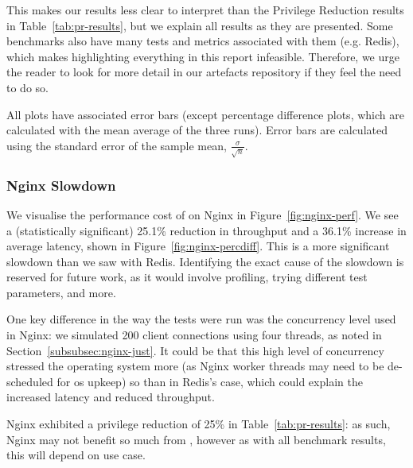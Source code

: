 This makes our results less clear to interpret than the Privilege Reduction
results in Table~\ref{tab:pr-results}, but we explain all
results as they are presented. Some benchmarks also have many tests
and metrics associated with them (e.g. Redis), which makes highlighting everything in this
report infeasible. Therefore, we urge the reader to look for more detail in our
artefacts repository if they feel the need to do so.

All plots have associated error bars (except percentage difference plots, which
are calculated with the mean average of the three runs). Error bars are
calculated using the standard error of the sample mean, 
$\frac{\sigma}{\sqrt n}$.

\subsubsection{Nginx Slowdown}\label{subsubsec:nginx-slowdown}

We visualise the performance cost of \af on Nginx in
Figure~\ref{fig:nginx-perf}. We see a (statistically significant) 25.1\%
reduction in throughput and a 36.1\% increase in average latency, shown in
Figure~\ref{fig:nginx-percdiff}. This is a more significant slowdown than
we saw with Redis. Identifying the exact cause of the slowdown is reserved
for future work, as it would involve profiling, trying different test
parameters, and more. 

One key difference in the way the tests were run was the concurrency level used
in Nginx: we simulated 200 client connections using four threads, as noted in
Section~\ref{subsubsec:nginx-just}. It could be that this high level of
concurrency stressed the operating system more (as Nginx worker threads may need
to be de-scheduled for \ac{os} upkeep) so than in Redis's case, which could
explain the increased latency and reduced throughput.

Nginx exhibited a privilege reduction of 25\% in Table~\ref{tab:pr-results}: as
such, Nginx may not benefit so much from \af, however as with all benchmark
results, this will depend on use case.

